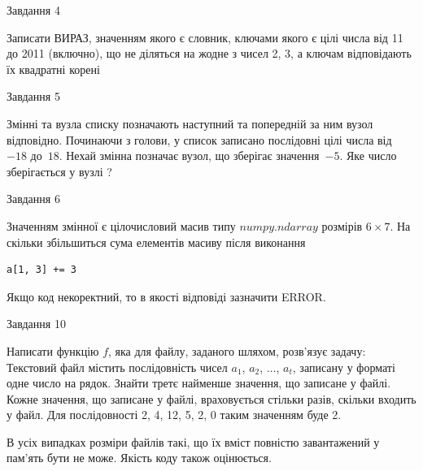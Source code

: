 \documentclass[12pt, ukrainian]{article}
\begin{document}
{               
{\begin{center}Завдання {4}\end{center}}
\vspace{-6mm}
Записати ВИРАЗ, значенням якого є словник, ключами якого є цілі числа від 11 до 2011 (включно), що не діляться на жодне з чисел 2, 3, а ключам відповідають їх квадратні корені\par

\vspace{10mm}
               
{\begin{center}Завдання {5}\end{center}}
\vspace{-6mm}
Змінні  та  вузла списку позначають наступний та попередній за ним вузол відповідно. Починаючи з голови, у список записано послідовні цілі числа від~$-18$ до~$18$. Нехай змінна  позначає вузол, що зберігає значення~$-5$.
Яке число зберігається у вузлі  ?\par

               
{\begin{center}Завдання {6}\end{center}}
\vspace{-6mm}
Значенням змінної  є цілочисловий масив типу $numpy.ndarray$ розмірів $6{\times}7$. На скільки збільшиться сума елементів масиву  після виконання
\begin{verbatim}
a[1, 3] += 3
\end{verbatim}


Якщо код некоректний, то в якості відповіді зазначити ERROR.\par

               
{\begin{center}Завдання {10}\end{center}}
\vspace{-6mm}

Написати функцію $f$, яка для файлу, заданого шляхом, розв’язує задачу:\\ Текстовий файл містить послідовність чисел $a_1$, $a_2$, $\ldots$, $a_t$, записану у форматі одне число на рядок. Знайти третє найменше значення, що записане у файлі. Кожне значення, що записане у файлі, враховується стільки разів, скільки входить у файл. Для послідовності 2, 4, 12, 5, 2, 0 таким значенням буде 2.

В усіх випадках розміри файлів такі, що їх вміст повністю завантажений у пам'ять бути не може. Якість коду також оцінюється.



}
\end{document}
